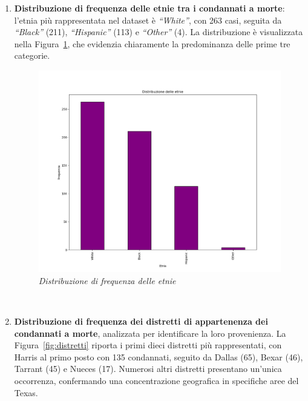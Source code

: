 \documentclass[11pt]{article}
\begin{document}
\begin{enumerate}
    \item \textbf{Distribuzione di frequenza delle etnie tra i condannati a morte}: l’etnia più rappresentata nel dataset è \textit{“White”}, con 263 casi, seguita da \textit{“Black”} (211), \textit{“Hispanic”} (113) e \textit{“Other”} (4). La distribuzione è visualizzata nella Figura~\ref{fig:distr_etnie}, che evidenzia chiaramente la predominanza delle prime tre categorie.
\begin{figure}
        \centering
        \includegraphics[width=1\linewidth]{grafico_etnie.png}
        \caption{\textit{Distribuzione di frequenza delle etnie}}
        \label{fig:distr_etnie}
    \end{figure}
\\
    \item \textbf{Distribuzione di frequenza dei distretti di appartenenza dei condannati a morte}, analizzata per identificare la loro provenienza. La Figura~\ref{fig:distretti} riporta i primi dieci distretti più rappresentati, con Harris al primo posto con 135 condannati, seguito da Dallas (65), Bexar (46), Tarrant (45) e Nueces (17). Numerosi altri distretti presentano un’unica occorrenza, confermando una concentrazione geografica in specifiche aree del Texas.
    \begin{figure}
        \centering

\end{figure}
\end{enumerate}
\end{document}
